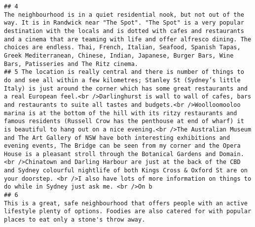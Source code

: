 \documentclass[
]{article}
\begin{document}
\begin{verbatim}
## 4                                                                                                                                                                                                                                                                                                                                                                                                                                                                                                                                                                       The neighbourhood is in a quiet residential nook, but not out of the way. It is in Randwick near "The Spot". "The Spot" is a very popular destination with the locals and is dotted with cafes and restaurants and a cinema that are teaming with life and offer alfresco dining. The choices are endless. Thai, French, Italian, Seafood, Spanish Tapas, Greek Mediterranean, Chinese, Indian, Japanese, Burger Bars, Wine Bars, Patisseries and The Ritz cinema.
## 5 The location is really central and there is number of things to do and see all within a few kilometres; Stanley St (Sydney’s little Italy) is just around the corner which has some great restaurants and a real European feel.<br />Darlinghurst is wall to wall of cafes, bars and restaurants to suite all tastes and budgets.<br />Woolloomooloo marina is at the bottom of the hill with its ritzy restaurants and famous residents (Russell Crow has the penthouse at end of wharf) it is beautiful to hang out on a nice evening.<br />The Australian Museum and The Art Gallery of NSW have both interesting exhibitions and evening events, The Bridge can be seen from my corner and the Opera House is a pleasant stroll through the Botanical Gardens and Domain.<br />Chinatown and Darling Harbour are just at the back of the CBD and Sydney colourful nightlife of both Kings Cross & Oxford St are on your doorstep. <br />I also have lots of more information on things to do while in Sydney just ask me. <br />On b
## 6                                                                                                                                                                                                                                                                                                                                                                                                                                                                                                                                                                                                                                                                                                                                                                                                                                                    This is a great, safe neighbourhood that offers people with an active lifestyle plenty of options. Foodies are also catered for with popular places to eat only a stone's throw away.

\end{verbatim}
\end{document}
